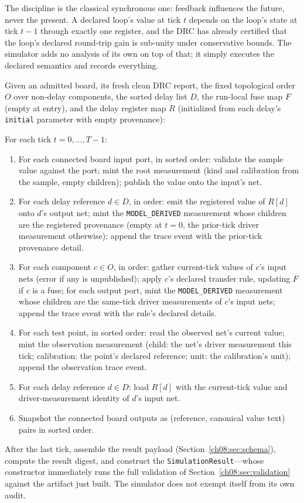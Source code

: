 The discipline is the classical synchronous one: feedback influences the future, never the present. A declared loop's value at tick $t$ depends on the loop's state at tick $t-1$ through exactly one register, and the DRC has already certified that the loop's declared round-trip gain is sub-unity under conservative bounds. The simulator adds no analysis of its own on top of that; it simply executes the declared semantics and records everything.

\begin{algorithm}\label{ch08:alg:tick}
Given an admitted board, its fresh clean DRC report, the fixed topological order $O$ over non-delay components, the sorted delay list $D$, the run-local fuse map $F$ (empty at entry), and the delay register map $R$ (initialized from each delay's \texttt{initial} parameter with empty provenance):

For each tick $t = 0, \ldots, T-1$:
\begin{enumerate}
\item For each connected board input port, in sorted order: validate the sample value against the port; mint the root measurement (kind and calibration from the sample, empty children); publish the value onto the input's net.
\item For each delay reference $d \in D$, in order: emit the registered value of $R[d]$ onto $d$'s output net; mint the \texttt{MODEL\_DERIVED} measurement whose children are the registered provenance (empty at $t=0$, the prior-tick driver measurement otherwise); append the trace event with the prior-tick provenance detail.
\item For each component $c \in O$, in order: gather current-tick values of $c$'s input nets (error if any is unpublished); apply $c$'s declared transfer rule, updating $F$ if $c$ is a fuse; for each output port, mint the \texttt{MODEL\_DERIVED} measurement whose children are the same-tick driver measurements of $c$'s input nets; append the trace event with the rule's declared details.
\item For each test point, in sorted order: read the observed net's current value; mint the observation measurement (child: the net's driver measurement this tick; calibration: the point's declared reference; unit: the calibration's unit); append the observation trace event.
\item For each delay reference $d \in D$: load $R[d]$ with the current-tick value and driver-measurement identity of $d$'s input net.
\item Snapshot the connected board outputs as (reference, canonical value text) pairs in sorted order.
\end{enumerate}
After the last tick, assemble the result payload (Section~\ref{ch08:sec:schema}), compute the result digest, and construct the \texttt{SimulationResult}---whose constructor immediately runs the full validation of Section~\ref{ch08:sec:validation} against the artifact just built. The simulator does not exempt itself from its own audit.
\end{algorithm}

